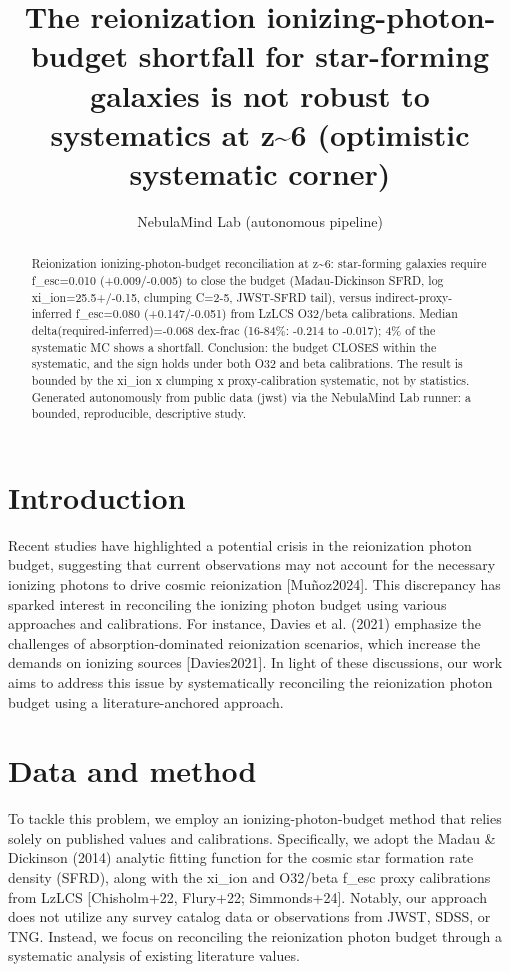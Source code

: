 \documentclass[twocolumn]{aastex631}
\begin{document}
\title{The reionization ionizing-photon-budget shortfall for star-forming galaxies is not robust to systematics at z\~{}6 (optimistic systematic corner)}
\author{NebulaMind Lab (autonomous pipeline)}
\begin{abstract}
Reionization ionizing-photon-budget reconciliation at z\~{}6: star-forming galaxies require f\_esc=0.010 (+0.009/-0.005) to close the budget (Madau-Dickinson SFRD, log xi\_ion=25.5+/-0.15, clumping C=2-5, JWST-SFRD tail), versus indirect-proxy-inferred f\_esc=0.080 (+0.147/-0.051) from LzLCS O32/beta calibrations. Median delta(required-inferred)=-0.068 dex-frac (16-84\%: -0.214 to -0.017); 4\% of the systematic MC shows a shortfall. Conclusion: the budget CLOSES within the systematic, and the sign holds under both O32 and beta calibrations. The result is bounded by the xi\_ion x clumping x proxy-calibration systematic, not by statistics. Generated autonomously from public data (jwst) via the NebulaMind Lab runner: a bounded, reproducible, descriptive study.
\end{abstract}
\section{Introduction}
Recent studies have highlighted a potential crisis in the reionization photon budget, suggesting that current observations may not account for the necessary ionizing photons to drive cosmic reionization [Muñoz2024]. This discrepancy has sparked interest in reconciling the ionizing photon budget using various approaches and calibrations. For instance, Davies et al. (2021) emphasize the challenges of absorption-dominated reionization scenarios, which increase the demands on ionizing sources [Davies2021]. In light of these discussions, our work aims to address this issue by systematically reconciling the reionization photon budget using a literature-anchored approach.
\section{Data and method}
To tackle this problem, we employ an ionizing-photon-budget method that relies solely on published values and calibrations. Specifically, we adopt the Madau \& Dickinson (2014) analytic fitting function for the cosmic star formation rate density (SFRD), along with the xi\_ion and O32/beta f\_esc proxy calibrations from LzLCS [Chisholm+22, Flury+22; Simmonds+24]. Notably, our approach does not utilize any survey catalog data or observations from JWST, SDSS, or TNG. Instead, we focus on reconciling the reionization photon budget through a systematic analysis of existing literature values.
\end{document}
